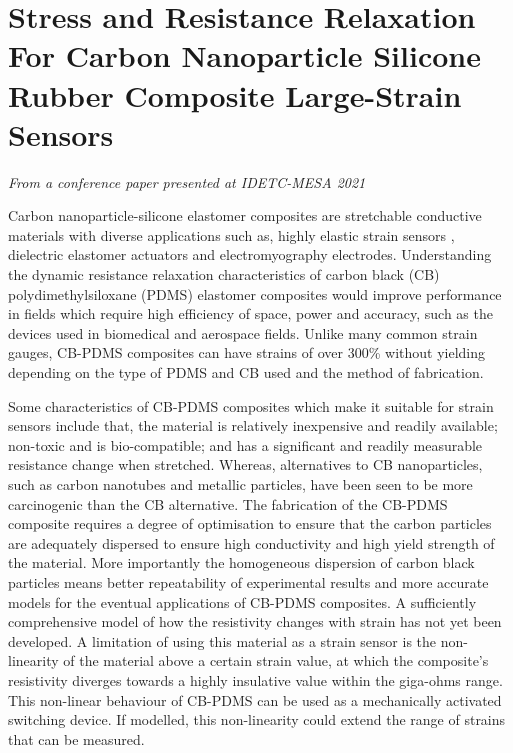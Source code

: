 \section{Stress and Resistance Relaxation For Carbon Nanoparticle Silicone Rubber Composite Large-Strain Sensors}
\label{sec:Stress and Resistance Relaxation}
\textit{From a conference paper presented at IDETC-MESA 2021}

Carbon nanoparticle-silicone elastomer composites are stretchable conductive materials with diverse applications such as, highly elastic strain sensors \cite{Lacasse2010,Spahr2017,Kim2018}, dielectric elastomer actuators \cite{Henke2018,Liu2009} and electromyography electrodes\cite{Carpi2010,Kim2018,Mouri2019}. Understanding the dynamic resistance relaxation characteristics of carbon black (CB) polydimethylsiloxane (PDMS) elastomer composites would improve performance in fields which require high efficiency of space, power and accuracy, such as the devices used in biomedical and aerospace fields. Unlike many common strain gauges, CB-PDMS composites can have strains of over 300\% without yielding\cite{Wang2010} depending on the type of PDMS and CB used and the method of fabrication. 


Some characteristics of CB-PDMS composites which make it suitable for strain sensors include that, the material is relatively inexpensive and readily available; non-toxic and is bio-compatible; and has a significant and readily measurable resistance change when stretched. Whereas, alternatives to CB nanoparticles, such as carbon nanotubes\cite{Maddipatla2017,Wang2013} and metallic particles\cite{Quinsaat2015,Racles2021}, have been seen to be more carcinogenic than the CB alternative\cite{Fukushima2018,Ferdous2020,Rausch2004}. The fabrication of the CB-PDMS composite requires a degree of optimisation to ensure that the carbon particles are adequately dispersed to ensure high conductivity and high yield strength of the material. More importantly the homogeneous dispersion of carbon black particles means better repeatability of experimental results and more accurate models for the eventual applications of CB-PDMS composites. A sufficiently comprehensive model of how the resistivity changes with strain has not yet been developed. A limitation of using this material as a strain sensor is the non-linearity of the material above a certain strain value, at which the composite's resistivity diverges towards a highly insulative value within the giga-ohms range. This non-linear behaviour of CB-PDMS can be used as a mechanically activated switching device\cite{Henke2018}. If modelled, this non-linearity could extend the range of strains that can be measured.

